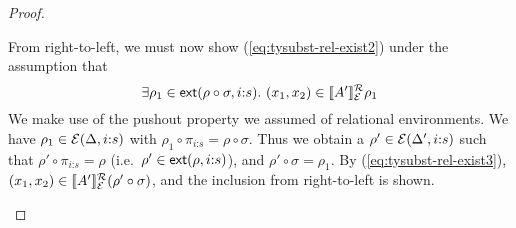 \begin{proof}
\begin{enumerate}
\begin{description}
      From right-to-left, we must now show
      (\ref{eq:tysubst-rel-exist2}) under the assumption that
      \begin{equation}
        \label{eq:tysubst-rel-exist3}
        \exists \rho_1 \in \extends{\rho \circ \sigma}{i\mathord:s}.\ (x_1,x_2) \in \rsem{A'}{\relEnv{E}}{\rho_1}
      \end{equation}
      We make use of the pushout property we assumed of relational
      environments.  We have $\rho_1 \in \mathcal{E}(\Delta,
      i\mathord:s)$ with $\rho_1 \circ \pi_{i\mathord:s} = \rho \circ
      \sigma$. Thus we obtain a $\rho' \in
      \mathcal{E}(\Delta',i\mathord:s)$ such that $\rho' \circ
      \pi_{i\mathord:s} = \rho$ (i.e.~$\rho' \in
      \mathsf{ext}(\rho,i\mathord:s)$), and $\rho' \circ \sigma =
      \rho_1$. By (\ref{eq:tysubst-rel-exist3}), $(x_1,x_2) \in
      \llbracket A' \rrbracket^{\mathcal{R}}_{\mathcal{E}}{(\rho' \circ \sigma)}$, and the inclusion
      from right-to-left is shown.
    \end{description}
  \end{enumerate}
\end{proof}

